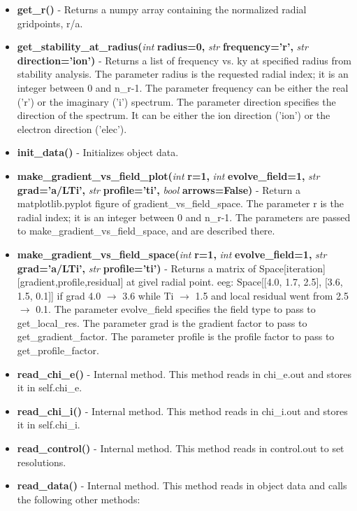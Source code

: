 \documentclass{article}
\begin{document}
\begin{itemize}
\begin{itemize}
\item \textbf{get\_r()} - Returns a numpy array containing the normalized radial gridpoints, r/a.
\item \textbf{get\_stability\_at\_radius(}\emph{int}\textbf{ radius=0,}\emph{ str}\textbf{ frequency='r',}\emph{ str}\textbf{ direction='ion')} - Returns a list of frequency vs. ky at specified radius from stability analysis.  The parameter radius is the requested radial index; it is an integer between 0 and n\_r-1.  The parameter frequency can be either the real ('r') or the imaginary ('i') spectrum.  The parameter direction specifies the direction of the spectrum.  It can be either the ion direction ('ion') or the electron direction ('elec').
\item \textbf{init\_data()} - Initializes object data.
\item \textbf{make\_gradient\_vs\_field\_plot(}\emph{int}\textbf{ r=1,}\emph{ int}\textbf{ evolve\_field=1,}\emph{ str}\textbf{ grad='a/LTi',}\emph{ str}\textbf{ profile='ti',}\emph{ bool}\textbf{ arrows=False)} - Return a matplotlib.pyplot figure of gradient\_vs\_field\_space.  The parameter r is the radial index; it is an integer between 0 and n\_r-1.  The parameters are passed to make\_gradient\_vs\_field\_space, and are described there.
\item \textbf{make\_gradient\_vs\_field\_space(}\emph{int}\textbf{ r=1,}\emph{ int}\textbf{ evolve\_field=1,}\emph{ str}\textbf{ grad='a/LTi',}\emph{ str}\textbf{ profile='ti')} - Returns a matrix of Space[iteration][gradient,profile,residual] at givel radial point.  eeg: Space[[4.0, 1.7, 2.5], [3.6, 1.5, 0.1]] if grad 4.0 $\rightarrow$ 3.6 while Ti $\rightarrow$ 1.5 and local residual went from 2.5 $\rightarrow$ 0.1.  The parameter evolve\_field specifies the field type to pass to get\_local\_res.  The parameter grad is the gradient factor to pass to get\_gradient\_factor.  The parameter profile is the profile factor to pass to get\_profile\_factor.
\item \textbf{read\_chi\_e()} - Internal method.  This method reads in chi\_e.out and stores it in self.chi\_e.
\item \textbf{read\_chi\_i()} - Internal method.  This method reads in chi\_i.out and stores it in self.chi\_i.
\item \textbf{read\_control()} - Internal method.  This method reads in control.out to set resolutions.
\item \textbf{read\_data()} - Internal method.  This method reads in object data and calls the following other methods:

\end{itemize}
\end{itemize}
\end{document}
